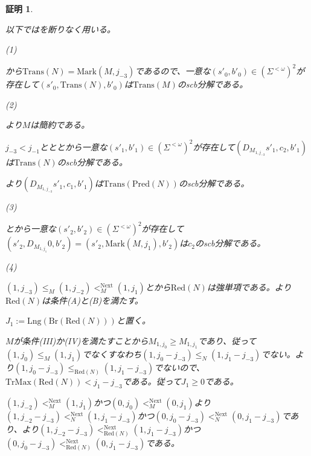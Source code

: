 \documentclass[dvipdfmx,uplatex]{jsarticle}
\theoremstyle{customnonumberbreakfortheorem}
\theoremstyle{customnonumberbreakforproof}
\newtheorem{hideableproof}{証明}
\begin{document}
\begin{hideableproof}
	\begin{indented}
		\item 以下ではを断りなく用いる。
		\item
		\item (1)
		\item {}から\(\textrm{Trans}(N) = \textrm{Mark}(M,j_{-3})\)であるので、一意な\((s'_0,b'_0) \in (\Sigma^{< \omega})^2\)が存在して\((s'_0,\textrm{Trans}(N),b'_0)\)は\(\textrm{Trans}(M)\)のscb分解である。
		\item
		\item (2)
		\item {}より\(M\)は簡約である。
		\item \(j_{-3} < j_{-1}\)とととから一意な\((s'_1,b'_1) \in (\Sigma^{< \omega})^2\)が存在して\((D_{M_{1,j_{-3}}} s'_1,c_2,b'_1)\)は\(\textrm{Trans}(N)\)のscb分解である。
		\item {}より\((D_{M_{1,j_{-3}}} s'_1,c_1,b'_1)\)は\(\textrm{Trans}(\textrm{Pred}(N))\)のscb分解である。
		\item
		\item (3)
		\item {}とから一意な\((s'_2,b'_2) \in (\Sigma^{< \omega})^2\)が存在して\((s'_2,D_{M_{1,j_1}} 0,b'_2) = (s'_2,\textrm{Mark}(M,j_1),b'_2)\)は\(c_2\)のscb分解である。
		\item
		\item (4)
		\item \((1,j_{-3}) \leq_M (1,j_{-2}) <_M^{\textrm{Next}} (1,j_1)\)とから\(\textrm{Red}(N)\)は強単項である。より\(\textrm{Red}(N)\)は条件(A)と(B)を満たす。
		\item \(J_1 := \textrm{Lng}(\textrm{Br}(\textrm{Red}(N)))\)と置く。
		\item \(M\)が条件(III)か(IV)を満たすことから\(M_{1,j_0} \geq M_{1,j_1}\)であり、従って\((1,j_0) \leq_M (1,j_1)\)でなくすなわち\((1,j_0-j_{-3}) \leq_N (1,j_1-j_{-3})\)でない。より\((1,j_0-j_{-3}) \leq_{\textrm{Red}(N)} (1,j_1-j_{-3})\)でないので、\(\textrm{TrMax}(\textrm{Red}(N)) < j_1-j_{-3}\)である。従って\(J_1 \geq 0\)である。
		\item \((1,j_{-2}) <_M^{\textrm{Next}} (1,j_1)\)かつ\((0,j_0) <_M^{\textrm{Next}} (0,j_1)\)より\((1,j_{-2}-j_{-3}) <_N^{\textrm{Next}} (1,j_1-j_{-3})\)かつ\((0,j_0-j_{-3}) <_N^{\textrm{Next}} (0,j_1-j_{-3})\)であり、より\((1,j_{-2}-j_{-3}) <_{\textrm{Red}(N)}^{\textrm{Next}} (1,j_1-j_{-3})\)かつ\((0,j_0-j_{-3}) <_{\textrm{Red}(N)}^{\textrm{Next}} (0,j_1-j_{-3})\)である。

\end{indented}
\end{hideableproof}
\end{document}
